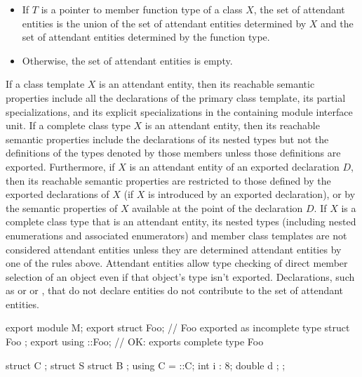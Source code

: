 \begin{std.txt}
\begin{before}
\begin{itemize}
    \item\color{addclr} If $T$ is a pointer to member function type of a class $X$, the
    set of attendant entities is the union of the set of attendant entities
     determined by $X$ and the set of attendant entities determined by
    the function type.
    
    \item\color{addclr} Otherwise, the set of attendant entities is empty.
  \end{itemize}
\end{before}\begin{before}\color{addclr}
  If a class template $X$ is an attendant entity, then its reachable semantic
  properties include all the declarations of the primary class template,
  its partial specializations, and its explicit specializations in the
  containing module interface unit.
  If a complete class type $X$ is an attendant entity, then its reachable
  semantic properties include the declarations of its nested types but
  not the definitions of the types denoted by those members
   unless those definitions are exported.
  Furthermore, if $X$ is an attendant entity of an 
  exported declaration $D$, then its reachable semantic properties are 
  restricted to those defined by the exported declarations of $X$ 
  (if $X$ is introduced by an exported declaration), or by 
  the semantic properties of $X$ available at the point of the declaration $D$.
  \enternote
  If $X$ is a complete class type that is an attendant entity, its nested types
  (including nested enumerations and associated enumerators) 
  and member class templates
  are not considered attendant entities unless they are determined attendant
  entities by one of the rules above.  Attendant entities allow type checking 
  of direct member selection of an object even if that object's type isn't exported.
  Declarations, such as  or
   or 
  ,
   that do not declare entities do not contribute to the set of attendant entities.
  \exitnote
  \begin{example}
    \begin{codeblock}
      export module M;
      export struct Foo;          // Foo exported as incomplete type
      struct Foo { };
      export using ::Foo;         // OK: exports complete type Foo

      struct C { };
      struct S {
        struct B { };
        using C = ::C;
        int i : 8;
        double d { };
      };


\end{codeblock}
\end{example}
\end{before}
\end{std.txt}
